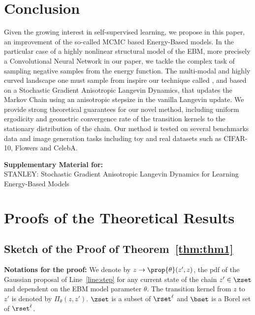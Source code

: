 \documentclass[letterpaper]{article} %
\begin{document}
\section{Conclusion}\label{sec:conclusion}

Given the growing interest in self-supervised learning, we propose in this paper, an improvement of the so-called MCMC based Energy-Based models.
In the particular case of a highly nonlinear structural model of the EBM, more precisely a Convolutional Neural Network in our paper, we tackle the complex task of sampling negative samples from the energy function.
The multi-modal and highly curved landscape one must sample from inspire our technique called \algo, and based on a Stochastic Gradient Anisotropic Langevin Dynamics, that updates the Markov Chain using an anisotropic stepsize in the vanilla Langevin update.
We provide strong theoretical guarantees for our novel method, including uniform ergodicity and geometric convergence rate of the transition kernels to the stationary distribution of the chain.
Our method is tested on several benchmarks data and image generation tasks including toy and real datasets such as CIFAR-10, Flowers and CelebA.


\clearpage

\newpage

\appendix

\onecolumn

\begin{center}
{\Large \textbf{Supplementary Material for:}\\
STANLEY: Stochastic Gradient Anisotropic Langevin Dynamics for Learning Energy-Based Models \par}
      
\end{center}      

\medskip
\section{Proofs of the Theoretical Results}\label{app:proofs}


\subsection{Sketch of the Proof of Theorem~\ref{thm:thm1}}

\textbf{Notations for the proof:}
We denote by $z \to \prop{\theta}(z',z)$, the pdf of the Gaussian proposal of Line~\ref{line:step} for any current state of the chain $z' \in \zset$ and dependent on the EBM model parameter $\theta$.
The transition kernel from $z$ to $z'$ is denoted by $\Pi_\theta(z, z')$.
$\zset$ is a subset of $\rset^\ell$ and $\bset$ is a Borel set of $\rset^\ell$.
\end{document}
